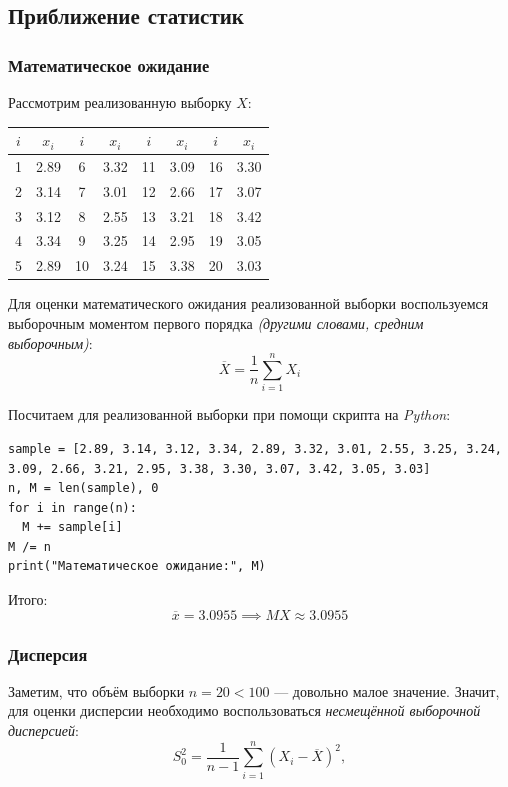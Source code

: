 \subsection{Приближение статистик}

\subsubsection{Математическое ожидание}

Рассмотрим реализованную выборку \( X \):

\begin{center}
\begin{tabular}{|c|c||c|c||c|c||c|c|}
\hline
$i$ & $x_i$ & $i$ & $x_i$ & $i$ & $x_i$ & $i$ & $x_i$ \\ \hline \hline
1 & 2.89 & 6  & 3.32 & 11 & 3.09 & 16 & 3.30 \\ \hline
2 & 3.14 & 7  & 3.01 & 12 & 2.66 & 17 & 3.07 \\ \hline
3 & 3.12 & 8  & 2.55 & 13 & 3.21 & 18 & 3.42 \\ \hline
4 & 3.34 & 9  & 3.25 & 14 & 2.95 & 19 & 3.05 \\ \hline
5 & 2.89 & 10 & 3.24 & 15 & 3.38 & 20 & 3.03 \\ \hline
\end{tabular}
\end{center}

Для оценки математического ожидания реализованной выборки воспользуемся выборочным моментом первого порядка \textit{(другими словами, средним выборочным)}:
\[
    \overline{X}=\frac{1}{n}\sum_{i=1}^n X_i
\]

Посчитаем для реализованной выборки при помощи скрипта на \textit{Python}:
\begin{lstlisting}
sample = [2.89, 3.14, 3.12, 3.34, 2.89, 3.32, 3.01, 2.55, 3.25, 3.24, 3.09, 2.66, 3.21, 2.95, 3.38, 3.30, 3.07, 3.42, 3.05, 3.03]
n, M = len(sample), 0
for i in range(n):
  M += sample[i]
M /= n
print("Математическое ожидание:", M)
\end{lstlisting}

Итого:
\[
    \overline{x}=3.0955\implies\boxed{
        MX\approx 3.0955
    }
\]

\subsubsection{Дисперсия}

Заметим, что объём выборки \( n=20<100 \) --- довольно малое значение. Значит, для оценки дисперсии необходимо воспользоваться \textit{несмещённой выборочной дисперсией}:
\[
    S_0^2=\dfrac{1}{n-1}\sum_{i=1}^n(X_i-\overline{X})^2,
\]

